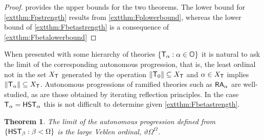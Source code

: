 \documentclass[UKenglish,cleveref,DIV=12]{scrartcl}
\let\forall\forallAlt
\newtheorem{theorem}{Theorem}
\theoremstyle{definition}
\theoremstyle{definition}
\begin{document}
\begin{proof}  provides the upper bounds for the two
theorems. The lower bound for \cref{extthm:Fpstrength} results from
\cref{extthm:Fplowerbound}, whereas the lower bound of
\cref{extthm:Fbetastrength} is a consequence of \cref{extthm:Fbetalowerbound}
\end{proof}
When presented with some hierarchy of theories $\{\mathsf{T}_\alpha:\alpha\in\mathbb{O}\}$ it is natural to ask the limit of the corresponding
autonomous progression, that is, the least ordinal not in the set $X_{\mathsf{T}}$ generated by the operation $\lVert{\mathsf{T}_0}\rVert\subseteq X_{\mathsf{T}}$ and
$\alpha\in X_{\mathsf{T}}$ implies $\lVert{\mathsf{T}_\alpha}\rVert\subseteq X_{\mathsf{T}}$. Autonomous progressions of ramified theories such as $\mathsf{RA}_\alpha$ are well-studied, as are those obtained by
iterating reflection principles.
In the case $\mathsf{T}_\alpha=\mathsf{HST}_\alpha$ this is not difficult to determine
given \cref{extthm:Fbetastrength}.
\begin{theorem}\label{extthm:Fbauto}
 The limit of the autonomous progression defined from $\{\mathsf{HST}_\beta:\beta<\Omega\}$ is the large Veblen ordinal, $\vartheta\Omega^\Omega$.
\end{theorem}
\end{document}
